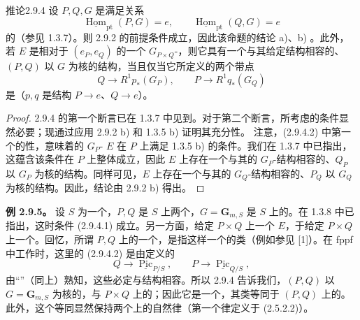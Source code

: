 \begin{SGAresult}{推论}{2.9.4}
设 $P,Q,G$ 是满足关系
\[
\underline{\operatorname{Hom}}_{\mathrm{pt}}(P,G)=e,\qquad
\underline{\operatorname{Hom}}_{\mathrm{pt}}(Q,G)=e\tag{2.9.4.1}
\]
的（参见 1.3.7）。则 2.9.2 的前提条件成立，因此该命题的结论 a)、b) 。此外，若 $E$ 是相对于 $(e_P,e_Q)$ 的一个 $G_{P\times Q}$-，则它具有一个与其给定结构相容的、$(P,Q)$ 以 $G$ 为核的结构，当且仅当它所定义的两个带点
\[
Q\longrightarrow R^1p_*(G_P),\qquad P\longrightarrow R^1q_*(G_Q)\tag{2.9.4.2}
\]
是（$p,q$ 是结构 $P\to e$、$Q\to e$）。
\end{SGAresult}
\begin{proof}
2.9.4 的第一个断言已在 1.3.7 中见到。对于第二个断言，所考虑的条件显然必要；现通过应用 2.9.2 b) 和 1.3.5 b) 证明其充分性。
注意，(2.9.4.2) 中第一个的性，意味着的 $G_P$- $E$ 在 $P$ 上满足 1.3.5 b) 的条件。我们在 1.3.7 中已指出，这蕴含该条件在 $P$ 上整体成立，因此 $E$ 上存在一个与其的 $G_P$-结构相容的、$Q_P$ 以 $G_P$ 为核的结构。同样可见，$E$ 上存在一个与其的 $G_Q$-结构相容的、$P_Q$ 以 $G_Q$ 为核的结构。因此，结论由 2.9.2 b) 得出。
\end{proof}

\textbf{例 2.9.5。} 设 $S$ 为一个，$P,Q$ 是 $S$ 上两个，$G=\mathbf G_{m,S}$ 是 $S$ 上的。在 1.3.8 中已指出，这时条件 (2.9.4.1) 成立。另一方面，给定 $P\times Q$ 上一个 $E$，于给定 $P\times Q$ 上一个。回忆，所谓 $P,Q$ 上的一个，是指这样一个的类（例如参见 [1]）。在 fppf 中工作时，这里的 (2.9.4.2) 是由定义的
\[
Q\longrightarrow\underline{\operatorname{Pic}}_{P/S},\qquad
P\longrightarrow\underline{\operatorname{Pic}}_{Q/S},\tag{2.9.5.1}
\]
由“”（同上）熟知，这些必定与结构相容。所以 2.9.4 告诉我们，$(P,Q)$ 以 $G=\mathbf G_{m,S}$ 为核的，与 $P\times Q$ 上的；因此它是一个，其类等同于 $(P,Q)$ 上的。
此外，这个等同显然保持两个上的自然律（第一个律定义于 (2.5.2.2)）。

